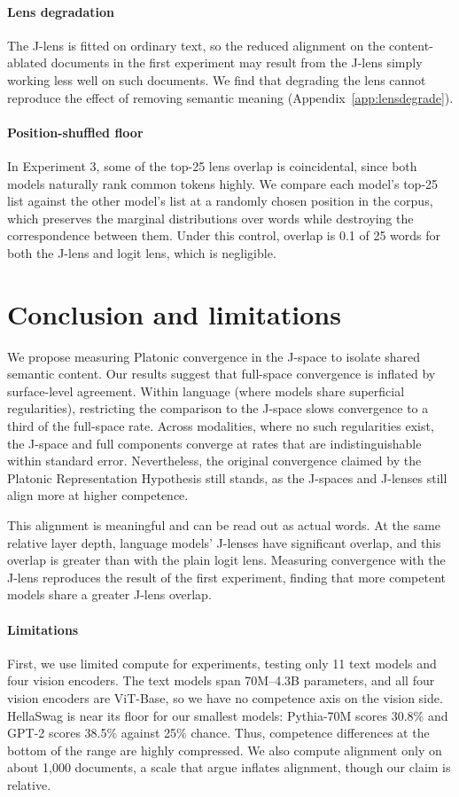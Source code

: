 \documentclass{article}
\begin{document}
\paragraph{Lens degradation}
The J-lens is fitted on ordinary text, so the reduced alignment on the content-ablated documents in the first experiment may result from the J-lens simply working less well on such documents. We find that degrading the lens cannot reproduce the effect of removing semantic meaning (Appendix~\ref{app:lensdegrade}).

\paragraph{Position-shuffled floor}
In Experiment 3, some of the top-25 lens overlap is coincidental, since both models naturally rank common tokens highly. We compare each model's top-25 list against the other model's list at a randomly chosen position in the corpus, which preserves the marginal distributions over words while destroying the correspondence between them. Under this control, overlap is 0.1 of 25 words for both the J-lens and logit lens, which is negligible.
\section{Conclusion and limitations}

We propose measuring Platonic convergence in the J-space to isolate shared semantic content. Our results suggest that full-space convergence is inflated by surface-level agreement. Within language (where models share superficial regularities), restricting the comparison to the J-space slows convergence to a third of the full-space rate. Across modalities, where no such regularities exist, the J-space and full components converge at rates that are indistinguishable within standard error. Nevertheless, the original convergence claimed by the Platonic Representation Hypothesis still stands, as the J-spaces and J-lenses still align more at higher competence.

This alignment is meaningful and can be read out as actual words. At the same relative layer depth, language models' J-lenses have significant overlap, and this overlap is greater than with the plain logit lens. Measuring convergence with the J-lens reproduces the result of the first experiment, finding that more competent models share a greater J-lens overlap.

\paragraph{Limitations}
First, we use limited compute for experiments, testing only 11 text models and four vision encoders. The text models span 70M--4.3B parameters, and all four vision encoders
are ViT-Base, so we have no competence axis on the vision side. HellaSwag is near its floor for our smallest models: Pythia-70M scores 30.8\% and GPT-2 scores 38.5\% against 25\% chance. Thus, competence differences at the bottom of the range are highly compressed. We also compute alignment only on about 1,000 documents, a scale that \citet{koepke2026platoscaveexaminingcrossmodal} argue inflates alignment, though our claim is relative.
\end{document}
